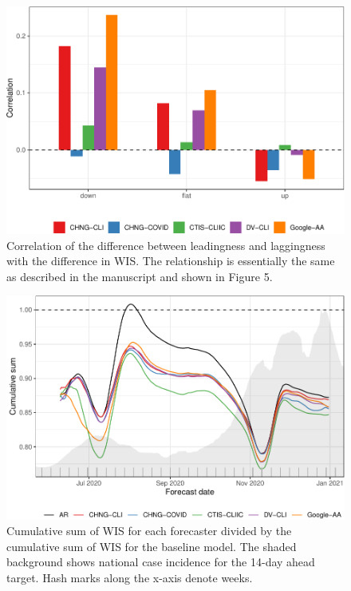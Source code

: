 \clearpage

\begin{figure}

{\centering \includegraphics[width=\textwidth]{fig/diff-in-lead-lag-1} 

}

\caption{Correlation of the difference between leadingness and laggingness with the difference in WIS. The relationship is essentially the same as described in the manuscript and shown in Figure 5.}\label{fig:diff-in-lead-lag}
\end{figure}

\clearpage

\clearpage

\begin{figure}

{\centering \includegraphics[width=\textwidth]{fig/cumulative-mean-1} 

}

\caption{Cumulative sum of WIS for each forecaster divided by the cumulative sum of WIS for the baseline model. The shaded background shows national case incidence for the 14-day ahead target. Hash marks along the x-axis denote weeks.}\label{fig:cumulative-mean}
\end{figure}

